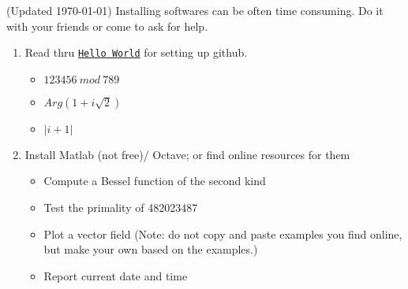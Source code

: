 \documentclass[12pt]{article}
\begin{document}
(Updated \today) Installing softwares can be often time consuming. Do it with your friends or come to ask for help.
\begin{enumerate}
\item Read thru \href{https://guides.github.com/activities/hello-world/}{{\tt Hello World}} for setting up github.
\begin{itemize}
\item $123456\ mod\ 789$ 
\item $Arg(1+i\sqrt{2})$ 
\item $|i+1|$
\end{itemize}
\item Install Matlab (not free)/ Octave; or find online resources for them 

\begin{itemize}
\item Compute a Bessel function of the second kind 
\item Test the primality of 482023487
\item Plot a vector field (Note: do not copy and paste examples you find online, but make your own based on the examples.) 
\item Report current date and time

\end{itemize}










\end{enumerate}
\end{document}
